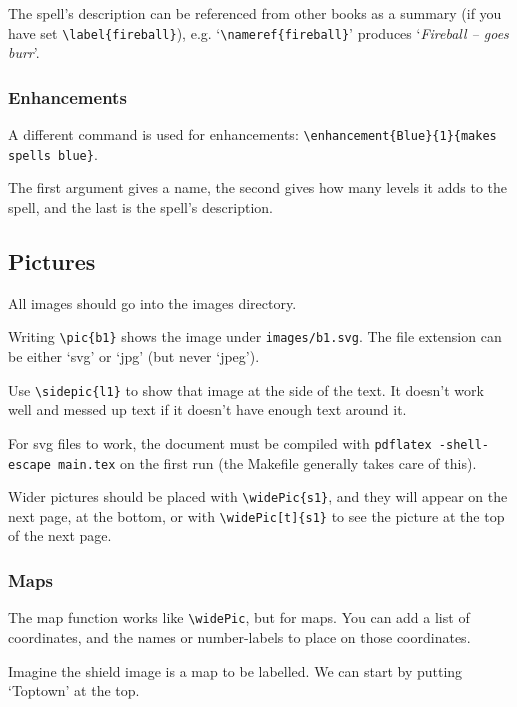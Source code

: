 \documentclass[a4paper,openany]{book}
\begin{document}
\begin{multicols}{2}
The spell's description can be referenced from other books as a summary (if you have set \verb"\label{fireball}"), e.g. `\verb"\nameref{fireball}"' produces `\textit{Fireball -- goes burr}'.

\subsubsection{Enhancements}
A different command is used for enhancements: \verb"\enhancement{Blue}{1}{makes spells blue}".

The first argument gives a name, the second gives how many levels it adds to the spell, and the last is the spell's description.

\subsection{Pictures}

All images should go into the images directory.

Writing \verb"\pic{b1}" shows the image under \verb"images/b1.svg".
The file extension can be either `svg' or `jpg' (but never `jpeg').

Use \verb"\sidepic{l1}" to show that image at the side of the text.
It doesn't work well and messed up text if it doesn't have enough text around it.


For svg files to work, the document must be compiled with \verb"pdflatex -shell-escape main.tex" on the first run (the Makefile generally takes care of this).

Wider pictures should be placed with \verb"\widePic{s1}", and they will appear on the next page, at the bottom, or with \verb"\widePic[t]{s1}" to see the picture at the top of the next page.


\subsubsection{Maps}

The map function works like \verb"\widePic", but for maps.
You can add a list of coordinates, and the names or number-labels to place on those coordinates.


Imagine the shield image is a map to be labelled.
We can start by putting `Toptown' at the top.


\end{multicols}
\end{document}
